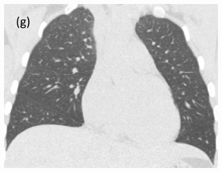 \documentclass[]{spie}  %
\begin{document}
{\begin{figure}[htbp]
\begin{subfigure}
{\begin{minipage}[t]{0.2\linewidth}
  \includegraphics[width=\linewidth,trim={{.0\wd0} {.0\wd0} {.0\wd0} {.0\wd0}},clip]{Image/H1335_FRC_Raw_Coronal.png}
  \centerline{}
	\end{minipage}%
   }%
  \label{fig:HLASegmentationResults-g} 
\end{subfigure}
\begin{subfigure}{
  \begin{minipage}[t]{0.2\linewidth}

\end{minipage}}
\end{subfigure}
\end{figure}}
\end{document}
